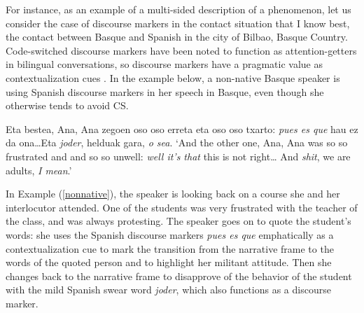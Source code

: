 \documentclass[output=paper]{langscibook}
\begin{document}
For instance, as an example of a multi-sided description of a phenomenon, let us consider the case of discourse markers in the contact situation that I know best, the contact between Basque and Spanish in the city of Bilbao, Basque Country. Code-switched discourse markers have been noted to function as attention-getters in bilingual conversations, so discourse markers have a pragmatic value as contextualization cues \parencite{maschler1997discourse}. In the example below, a non-native Basque speaker is using Spanish discourse markers in her speech in Basque, even though she otherwise tends to avoid CS.

\begin{exe}
\ex\label{nonnative}
Eta bestea, Ana, Ana zegoen oso oso erreta eta oso oso txarto: \textit{pues es que} hau ez da ona…Eta \textit{joder}, helduak gara, \textit{o sea}.
\glt `And the other one, Ana, Ana was so so frustrated and and so so unwell: \textit{well it's that} this is not right… And \textit{shit}, we are adults, \textit{I mean}.'
\end{exe}

\noindent In Example (\ref{nonnative}), the speaker is looking back on a course she and her interlocutor attended. One of the students was very frustrated with the teacher of the class, and was always protesting. The speaker goes on to quote the student’s words: she uses the Spanish discourse markers \textit{pues es que} emphatically as a contextualization cue to mark the transition from the narrative frame to the words of the quoted person and to highlight her militant attitude. Then she changes back to the narrative frame to disapprove of the behavior of the student with the mild Spanish swear word \textit{joder}, which also functions as a discourse marker.
\end{document}
